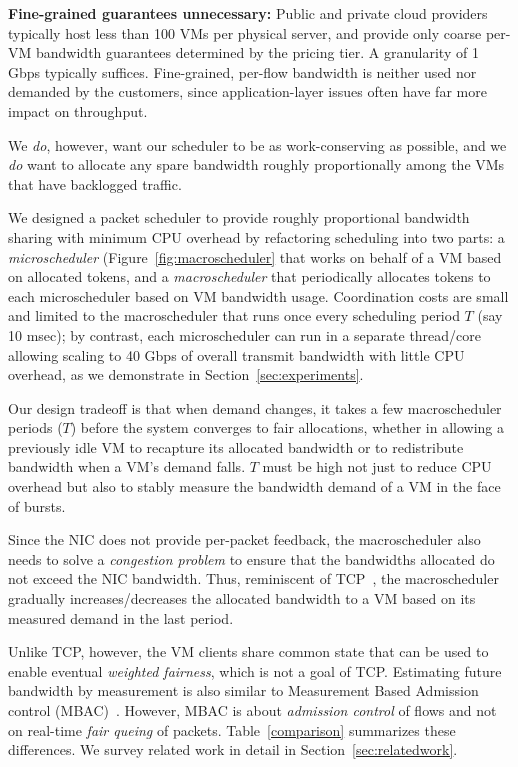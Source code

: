 {\bf Fine-grained guarantees unnecessary:} Public and private cloud providers typically host 
less than 100 VMs per physical server, and provide only coarse per-VM bandwidth guarantees
determined by the pricing tier.  A granularity of 1 Gbps typically suffices.  Fine-grained, per-flow bandwidth is neither
used nor demanded by the customers, since application-layer issues often have
far more impact on throughput.

We {\em do}, however, want our scheduler to be as
work-conserving as possible, and we {\em do} want to allocate any spare
bandwidth roughly proportionally among the VMs that have backlogged traffic. 

We designed a packet scheduler to provide roughly proportional bandwidth
sharing with  minimum CPU overhead by refactoring scheduling
into two parts: a {\em microscheduler} (Figure~\ref{fig:macroscheduler} that
works on behalf of a VM based on allocated tokens, and a {\em macroscheduler}
that periodically allocates tokens to each microscheduler based on VM bandwidth
usage.  Coordination costs are small and limited to the macroscheduler that runs
once every scheduling period $T$ (say 10 msec); by contrast, each microscheduler
can run in a separate thread/core allowing scaling to 40 Gbps of overall
transmit bandwidth with little CPU overhead, as we demonstrate in Section~\ref{sec:experiments}.

Our design tradeoff is that when demand changes, it takes a few 
macroscheduler periods ($T$) before the system converges to fair
allocations, whether in allowing a previously idle VM to recapture its allocated
bandwidth or to redistribute bandwidth when a VM's demand falls.  $T$  must be
high not just to reduce CPU overhead but also to stably measure 
the bandwidth demand of a VM in the face of bursts.

Since the NIC does not provide per-packet feedback, the macroscheduler also needs to
solve a {\em congestion problem} to ensure that the bandwidths allocated
do not exceed the NIC bandwidth.  
Thus, reminiscent of TCP~\cite{tcp}, the macroscheduler gradually
increases/decreases the allocated bandwidth to a VM based on its measured demand
in the last period.  

Unlike TCP, however, the VM clients share common state that can
be used to enable eventual {\em weighted fairness}, which is not a goal of
TCP.  Estimating future bandwidth by measurement is also similar
to  Measurement Based Admission control (MBAC)~\cite{mbac}.  However, MBAC is about {\em admission control} 
of flows  and not on real-time {\em fair queing} of packets. Table~\ref{comparison}
summarizes these differences. We survey related work in detail 
in Section~\ref{sec:relatedwork}.

